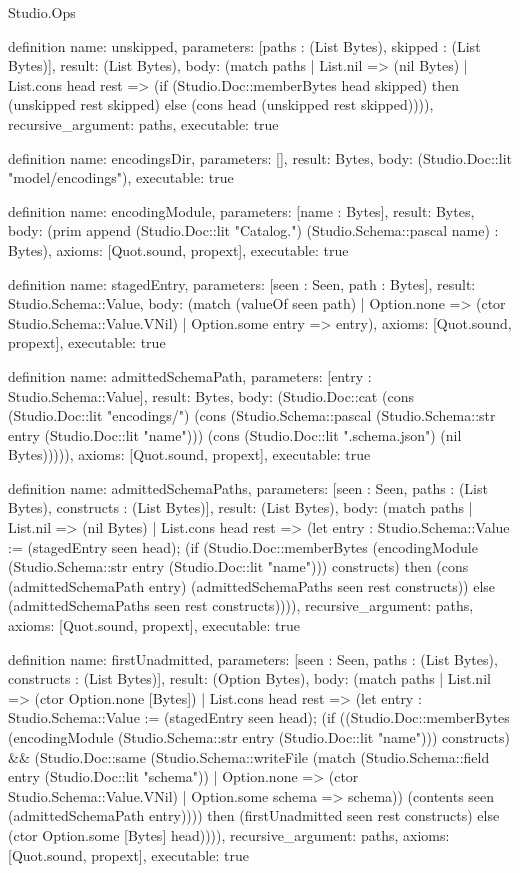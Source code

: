 \begin{lexlean}{Studio.Ops}
\begin{semanticmodule}
{definition{
  name: unskipped,
  parameters: [paths : (List Bytes), skipped : (List Bytes)],
  result: (List Bytes),
  body: (match paths
    | List.nil => (nil Bytes)
    | List.cons head rest => (if (Studio.Doc::memberBytes head skipped) then (unskipped rest skipped) else (cons head (unskipped rest skipped)))),
  recursive_argument: paths,
  executable: true
}

definition{
  name: encodingsDir,
  parameters: [],
  result: Bytes,
  body: (Studio.Doc::lit "model/encodings"),
  executable: true
}

definition{
  name: encodingModule,
  parameters: [name : Bytes],
  result: Bytes,
  body: (prim append (Studio.Doc::lit "Catalog.") (Studio.Schema::pascal name) : Bytes),
  axioms: [Quot.sound, propext],
  executable: true
}

definition{
  name: stagedEntry,
  parameters: [seen : Seen, path : Bytes],
  result: Studio.Schema::Value,
  body: (match (valueOf seen path)
    | Option.none => (ctor Studio.Schema::Value.VNil)
    | Option.some entry => entry),
  axioms: [Quot.sound, propext],
  executable: true
}

definition{
  name: admittedSchemaPath,
  parameters: [entry : Studio.Schema::Value],
  result: Bytes,
  body: (Studio.Doc::cat (cons (Studio.Doc::lit "encodings/") (cons (Studio.Schema::pascal (Studio.Schema::str entry (Studio.Doc::lit "name"))) (cons (Studio.Doc::lit ".schema.json") (nil Bytes))))),
  axioms: [Quot.sound, propext],
  executable: true
}

definition{
  name: admittedSchemaPaths,
  parameters: [seen : Seen, paths : (List Bytes), constructs : (List Bytes)],
  result: (List Bytes),
  body: (match paths
    | List.nil => (nil Bytes)
    | List.cons head rest => (let entry : Studio.Schema::Value := (stagedEntry seen head); (if (Studio.Doc::memberBytes (encodingModule (Studio.Schema::str entry (Studio.Doc::lit "name"))) constructs) then (cons (admittedSchemaPath entry) (admittedSchemaPaths seen rest constructs)) else (admittedSchemaPaths seen rest constructs)))),
  recursive_argument: paths,
  axioms: [Quot.sound, propext],
  executable: true
}

definition{
  name: firstUnadmitted,
  parameters: [seen : Seen, paths : (List Bytes), constructs : (List Bytes)],
  result: (Option Bytes),
  body: (match paths
    | List.nil => (ctor Option.none [Bytes])
    | List.cons head rest => (let entry : Studio.Schema::Value := (stagedEntry seen head); (if ((Studio.Doc::memberBytes (encodingModule (Studio.Schema::str entry (Studio.Doc::lit "name"))) constructs) && (Studio.Doc::same (Studio.Schema::writeFile (match (Studio.Schema::field entry (Studio.Doc::lit "schema"))
        | Option.none => (ctor Studio.Schema::Value.VNil)
        | Option.some schema => schema)) (contents seen (admittedSchemaPath entry)))) then (firstUnadmitted seen rest constructs) else (ctor Option.some [Bytes] head)))),
  recursive_argument: paths,
  axioms: [Quot.sound, propext],
  executable: true
}



}
\end{semanticmodule}
\end{lexlean}

